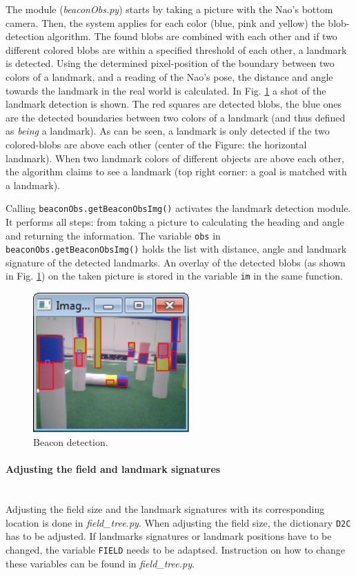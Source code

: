 \documentclass[11pt,a4paper,oneside]{article}
\begin{document}
The module (\textit{beaconObs.py}) starts by taking a picture with the Nao's bottom camera. Then, the system applies for each color (blue, pink and yellow) the blob-detection algorithm. The found blobs are combined with each other and if two different colored blobs are within a specified threshold of each other, a landmark is detected. Using the determined pixel-position of the boundary between two colors of a landmark, and a reading of the Nao's pose, the distance and angle towards the landmark in the real world is calculated. In Fig. \ref{fig:BeaconObs} a shot of the landmark detection is shown. The red squares are detected blobs, the blue ones are the detected boundaries between two colors of a landmark (and thus defined as \textit{being} a landmark). As can be seen, a landmark is only detected if the two colored-blobs are above each other (center of the Figure: the horizontal landmark). When two landmark colors of different objects are above each other, the algorithm claims to see a landmark (top right corner: a goal is matched with a landmark).

Calling \texttt{beaconObs.getBeaconObsImg()} activates the landmark detection module. It performs all steps: from taking a picture to calculating the heading and angle and returning the information. The variable \texttt{obs} in \texttt{beaconObs.getBeaconObsImg()} holds the list with distance, angle and landmark signature of the detected landmarks. An overlay of the detected blobs (as shown in  Fig. \ref{fig:BeaconObs}) on the taken picture is stored in the variable \texttt{im} in the same function.

\begin{figure}
\centering
\includegraphics[width=6cm]{beaconDetection.png}
\caption{Beacon detection.}
\label{fig:BeaconObs}
\end{figure}

\paragraph{Adjusting the field and landmark signatures} \indent \\
Adjusting the field size and the landmark signatures with its corresponding location is done in \textit{field\_tree.py}. When adjusting the field size, the dictionary \texttt{D2C} has to be adjusted. If landmarks signatures or landmark positions have to be changed, the variable \texttt{FIELD} needs to be adaptsed. Instruction on how to change these variables can be found in \textit{field\_tree.py}.
\end{document}
